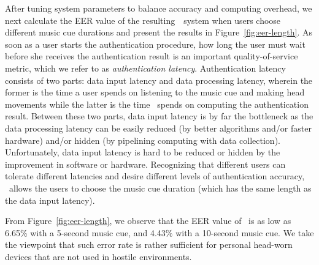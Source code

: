 After tuning system parameters to balance accuracy and computing overhead, we next calculate the EER value of the resulting~\systemname~system when users choose different music cue durations and present the results in Figure~\ref{fig:eer-length}. As soon as a user starts the authentication procedure, how long the user must wait before she receives the authentication result is an important quality-of-service metric, which we refer to as \emph{authentication latency}.  Authentication latency consists of two parts: data input latency and data processing latency, wherein the former is the time a user spends on listening to the music cue and making head movements while the latter is the time \systemname~spends on computing the authentication result. Between these two parts, data input latency is by far the bottleneck as the data processing latency can be easily reduced (by better algorithms and/or faster hardware) and/or hidden (by pipelining computing with data collection). Unfortunately, data input latency is hard to be reduced or hidden by the improvement in software or hardware. Recognizing that different users can tolerate different latencies and desire different levels of authentication accuracy, \systemname~allows the users to choose the music cue duration (which has the same length as the data input latency).

From Figure~\ref{fig:eer-length}, we observe that the EER value of \systemname~is as low as 6.65\% with a 5-second music cue, and 4.43\% with a 10-second music cue. We take the viewpoint that such error rate is rather sufficient for personal head-worn devices that are not used in hostile environments.
%

